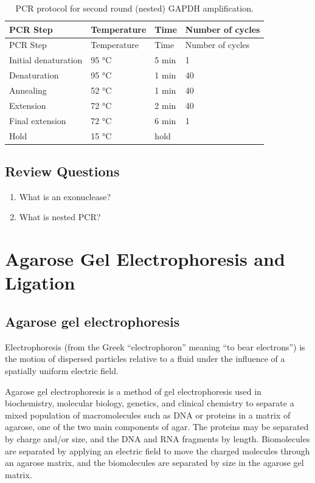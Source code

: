 \documentclass[]{book}
\providecommand{\tightlist}{%
  \setlength{\itemsep}{0pt}\setlength{\parskip}{0pt}}
\begin{document}
\begin{longtable}[]{@{}llll@{}}
\caption{\label{tab:nestedpcr} PCR protocol for second round (nested) GAPDH amplification.}\tabularnewline
\toprule
PCR Step & Temperature & Time & Number of cycles\tabularnewline
\midrule
\endfirsthead
\toprule
PCR Step & Temperature & Time & Number of cycles\tabularnewline
\midrule
\endhead
Initial denaturation & 95 °C & 5 min & 1\tabularnewline
Denaturation & 95 °C & 1 min & 40\tabularnewline
Annealing & 52 °C & 1 min & 40\tabularnewline
Extension & 72 °C & 2 min & 40\tabularnewline
Final extension & 72 °C & 6 min & 1\tabularnewline
Hold & 15 °C & hold &\tabularnewline
\bottomrule
\end{longtable}

\hypertarget{review-questions-6}{%
\section{Review Questions}\label{review-questions-6}}

\begin{enumerate}
\def\labelenumi{\arabic{enumi}.}
\tightlist
\item
  What is an exonuclease?
\item
  What is nested PCR?
\end{enumerate}

\hypertarget{agarose-gel-electrophoresis-and-ligation}{%
\chapter{Agarose Gel Electrophoresis and Ligation}\label{agarose-gel-electrophoresis-and-ligation}}

\hypertarget{agarose-gel-electrophoresis}{%
\section{Agarose gel electrophoresis}\label{agarose-gel-electrophoresis}}

Electrophoresis (from the Greek ``electrophoron'' meaning ``to bear electrons'') is the motion of dispersed particles relative to a fluid under the influence of a spatially uniform electric field.

Agarose gel electrophoresis is a method of gel electrophoresis used in biochemistry, molecular biology, genetics, and clinical chemistry to separate a mixed population of macromolecules such as DNA or proteins in a matrix of agarose, one of the two main components of agar. The proteins may be separated by charge and/or size, and the DNA and RNA fragments by length. Biomolecules are separated by applying an electric field to move the charged molecules through an agarose matrix, and the biomolecules are separated by size in the agarose gel matrix.
\end{document}
